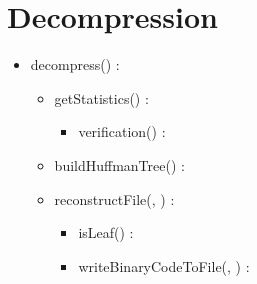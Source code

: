 \section{Decompression}


\begin{itemize}
    \item decompress(\binaryFile) : \binaryFile
    \begin{itemize}
        \item getStatistics(\binaryFile) : \statistics
        \begin{itemize}
            \item verification(\binaryFile) : \booleen
        \end{itemize}
        \item buildHuffmanTree(\statistics) : \huffmanTree
        \item reconstructFile(\binaryFile, \huffmanTree) : \binaryFile
        \begin{itemize}
            \item isLeaf(\huffmanTree) : \booleen
            \item writeBinaryCodeToFile(\binaryFile, \binaryCode) : \binaryFile
        \end{itemize}
    \end{itemize}
\end{itemize}